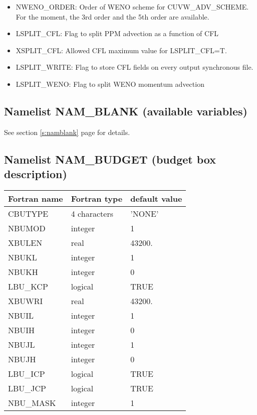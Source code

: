 \begin{itemize}
\item
{}
NWENO\_ORDER: Order of WENO scheme for CUVW\_ADV\_SCHEME. For the moment, 
the 3rd order and the 5th order are available.

\item
{}
LSPLIT\_CFL: Flag to split PPM advection as a function of CFL

\item
{}
XSPLIT\_CFL: Allowed CFL maximum value for LSPLIT\_CFL=T.  

\item
{}
LSPLIT\_WRITE: Flag to store CFL fields on every output synchronous file.

\item
{}
LSPLIT\_WENO: Flag to split WENO momentum advection


\end{itemize}
\subsection{Namelist NAM\_BLANK (available variables)}
See section \ref{s:namblank} page \pageref{s:namblank} for details.

\subsection{Namelist NAM\_BUDGET (budget box description)}
\label{ss:budget}

\begin{center}
\begin{tabular} {|l|l|l|}
\hline
Fortran name & Fortran type & default value \\
\hline
CBUTYPE   &  4 characters   & 'NONE'     \\
NBUMOD    & integer & 1        \\
XBULEN    & real    & 43200.   \\
NBUKL     & integer & 1        \\
NBUKH     & integer & 0        \\
LBU\_KCP  & logical & TRUE     \\
XBUWRI    & real    & 43200.   \\
NBUIL     & integer & 1        \\
NBUIH     & integer & 0        \\
NBUJL     & integer & 1        \\
NBUJH     & integer & 0        \\
LBU\_ICP  & logical & TRUE     \\
LBU\_JCP  & logical & TRUE     \\
NBU\_MASK & integer & 1 \\
\hline
\end{tabular}
\end{center}

